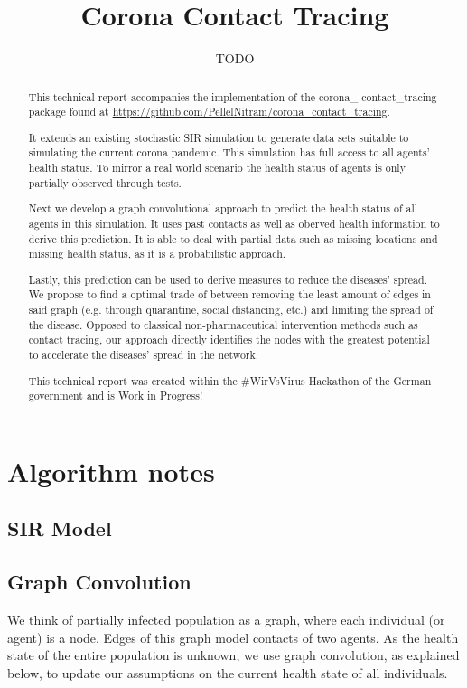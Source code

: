 \documentclass[]{article}
\title{Corona Contact Tracing}
\author{TODO}
\begin{document}
\maketitle

\begin{abstract}
	This technical report accompanies the implementation of the corona\_-contact\_tracing package found at \url{https://github.com/PellelNitram/corona_contact_tracing}.

	It extends an existing stochastic SIR simulation to generate data sets suitable to simulating the current corona pandemic.
	This simulation has full access to all agents' health status.
	To mirror a real world scenario the health status of agents is only partially observed through tests.

	Next we develop a graph convolutional approach to predict the health status of all agents in this simulation.
	It uses past contacts as well as oberved health information to derive this prediction.
	It is able to deal with partial data such as missing locations and missing health status, as it is a probabilistic approach.
	
	Lastly, this prediction can be used to derive measures to reduce the diseases' spread.
	We propose to find a optimal trade of between removing the least amount of edges in said graph (e.g. through quarantine, social distancing, etc.) and limiting the spread of the disease.
	Opposed to classical non-pharmaceutical intervention methods such as contact tracing, our approach directly identifies the nodes with the greatest potential to accelerate the diseases' spread in the network.
	
	This technical report was created within the \#WirVsVirus Hackathon of the German government and is Work in Progress!
\end{abstract}

\section{Algorithm notes}

\subsection{SIR Model}

\subsection{Graph Convolution}
We think of partially infected population as a graph, where each individual (or agent) is a node.
Edges of this graph model contacts of two agents.
As the health state of the entire population is unknown, we use graph convolution, as explained below, to update our assumptions on the current health state of all individuals.
\end{document}
